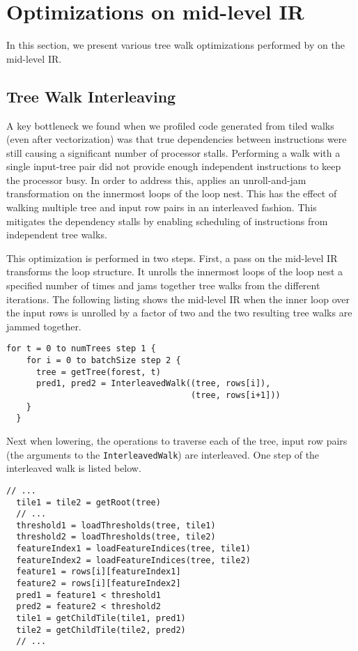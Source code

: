 \section{Optimizations on mid-level IR}
\label{Sec:MIR}
In this section, we present various tree walk optimizations performed by
\Treebeard{} on the mid-level IR.  

\subsection{Tree Walk Interleaving}
A key bottleneck we found when we profiled code generated from tiled walks (even 
after vectorization) was that true dependencies between instructions were still 
causing a significant number of processor stalls. Performing a walk with a 
single input-tree pair did not provide enough independent instructions to keep 
the processor busy. In order to address this, \Treebeard{} applies an 
unroll-and-jam transformation on the innermost loops of the loop nest. This has 
the effect of walking multiple tree and input row pairs in an interleaved 
fashion.  This mitigates the dependency stalls by enabling scheduling of 
instructions from independent tree walks. 

This optimization is performed in two steps. First, a pass on the mid-level IR 
transforms the loop structure.  It unrolls the innermost loops of the loop nest 
a specified number of times and jams together tree walks from the different 
iterations.  The following listing shows the mid-level IR when the inner loop 
over the input rows is unrolled by a factor of two and the two resulting tree 
walks are jammed together.

\begin{lstlisting}[style=c++]
  for t = 0 to numTrees step 1 {
    for i = 0 to batchSize step 2 {
      tree = getTree(forest, t)
      pred1, pred2 = InterleavedWalk((tree, rows[i]),
                                     (tree, rows[i+1]))
    }
  }
\end{lstlisting}
Next when lowering, the operations to traverse each of the tree, input row pairs 
(the arguments to the \texttt{InterleavedWalk}) are interleaved. One step of the interleaved 
walk is listed below. 
\begin{lstlisting}[style=c++]
  // ... 
  tile1 = tile2 = getRoot(tree)
  // ...
  threshold1 = loadThresholds(tree, tile1)
  threshold2 = loadThresholds(tree, tile2)
  featureIndex1 = loadFeatureIndices(tree, tile1)
  featureIndex2 = loadFeatureIndices(tree, tile2)
  feature1 = rows[i][featureIndex1]
  feature2 = rows[i][featureIndex2]
  pred1 = feature1 < threshold1
  pred2 = feature2 < threshold2
  tile1 = getChildTile(tile1, pred1)
  tile2 = getChildTile(tile2, pred2)
  // ...
\end{lstlisting}

